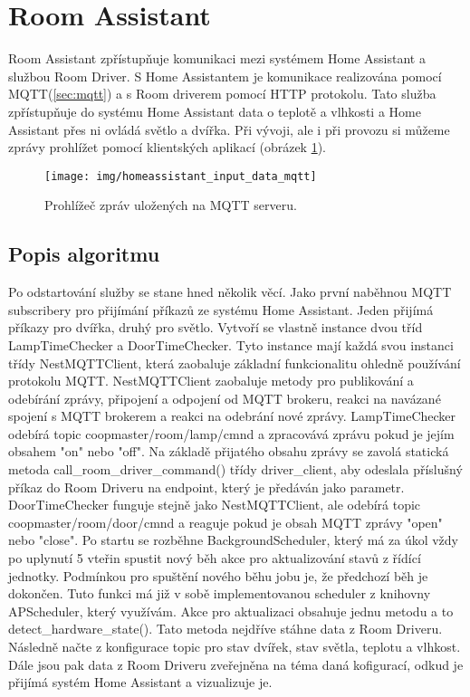 \section{Room Assistant}\label{sec:room-assistant}

Room Assistant zpřístupňuje komunikaci mezi systémem Home Assistant a službou Room Driver.\newline
S Home Assistantem je komunikace realizována pomocí MQTT(\ref{sec:mqtt}) a s Room driverem pomocí HTTP protokolu.
Tato služba zpřístupňuje do systému Home Assistant data o teplotě a vlhkosti a Home Assistant přes ni ovládá světlo a dvířka.
Při vývoji, ale i při provozu si můžeme zprávy prohlížet pomocí klientských aplikací (obrázek \ref{fig:homeassistant_input_data_mqtt}).

\begin{figure}[h]
    \centering
    \texttt{[image: img/homeassistant\_input\_data\_mqtt]}
    \caption{Prohlížeč zpráv uložených na MQTT serveru.}
    \label{fig:homeassistant_input_data_mqtt}
\end{figure}


\subsection*{Popis algoritmu}
Po odstartování služby se stane hned několik věcí.
Jako první naběhnou MQTT subscribery pro přijímání příkazů ze systému Home Assistant.
Jeden přijímá příkazy pro dvířka, druhý pro světlo.
Vytvoří se vlastně instance dvou tříd LampTimeChecker a DoorTimeChecker. \newline
Tyto instance mají každá svou instanci třídy NestMQTTClient, která zaobaluje základní funkcionalitu ohledně používání protokolu MQTT.
NestMQTTClient zaobaluje metody pro publikování a odebírání zprávy, připojení a odpojení od MQTT brokeru, reakci na navázané spojení s MQTT brokerem a reakci na odebrání nové zprávy.
LampTimeChecker odebírá topic coopmaster/room/lamp/cmnd  a zpracovává zprávu pokud je jejím obsahem "on" nebo "off".
Na základě přijatého obsahu zprávy se zavolá statická metoda call\_room\_driver\_command() třídy driver\_client, aby odeslala příslušný příkaz do Room Driveru na endpoint, který je předáván jako parametr.
DoorTimeChecker funguje stejně jako NestMQTTClient, ale odebírá topic coopmaster/room/door/cmnd  a reaguje pokud je obsah MQTT zprávy "open" nebo "close".\newline
Po startu se rozběhne BackgroundScheduler, který má za úkol vždy po uplynutí 5 vteřin spustit nový běh akce pro aktualizování stavů z řídící jednotky.
Podmínkou pro spuštění nového běhu jobu je, že předchozí běh je dokončen.
Tuto funkci má již v sobě implementovanou scheduler z knihovny APScheduler, který využívám.
Akce pro aktualizaci obsahuje jednu metodu a to detect\_hardware\_state().
Tato metoda nejdříve stáhne data z Room Driveru.
Následně načte z konfigurace topic pro stav dvířek, stav světla, teplotu a vlhkost.
Dále jsou pak data z Room Driveru zveřejněna na téma daná kofigurací, odkud je přijímá systém Home Assistant a vizualizuje je.

